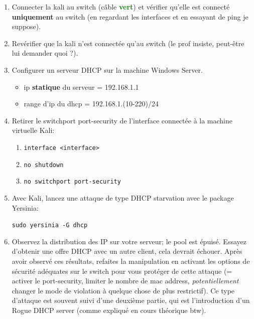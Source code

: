 \documentclass[a4paper]{article}
\begin{document}
\begin{enumerate}

\item Connecter la kali au switch (câble \textcolor{green}{\textbf{vert}}) et vérifier qu'elle est connecté \textbf{uniquement} au switch (en regardant les interfaces et en essayant de ping je suppose).

\item Revérifier que la kali n'est connectée qu'au switch (le prof insiste, peut-être lui demander quoi ?).

\item Configurer un serveur DHCP sur la machine Windows Server.
\begin{example}
    \begin{itemize}
        \item ip \textbf{statique} du serveur = 192.168.1.1
        \item range d'ip du dhcp = 192.168.1.(10-220)/24
    \end{itemize}
\end{example}

\item Retirer le switchport port-security de l’interface connectée à la machine virtuelle Kali:
\begin{enumerate}
    \item \texttt{interface <interface>}
    \item \texttt{no shutdown}
    \item \texttt{no switchport port-security}
\end{enumerate}

\item Avec Kali, lancez une attaque de type DHCP starvation avec le package Yersinia:
\begin{example}
    \texttt{sudo yersinia -G dhcp}
\end{example}

\item Observez la distribution des IP sur votre serveur; le pool est épuisé. Essayez d’obtenir une offre DHCP avec un autre client, cela devrait échouer. Après avoir observé ces résultats, refaites la manipulation en activant les options de sécurité adéquates sur le switch pour vous protéger de cette attaque (= activer le port-security, limiter le nombre de mac address, \textit{potentiellement} changer le mode de violation à quelque chose de plus restrictif). Ce type d’attaque est souvent suivi d’une deuxième partie, qui est l’introduction d’un Rogue DHCP 
server (comme expliqué en cours théorique btw).

\end{enumerate}
\end{document}
